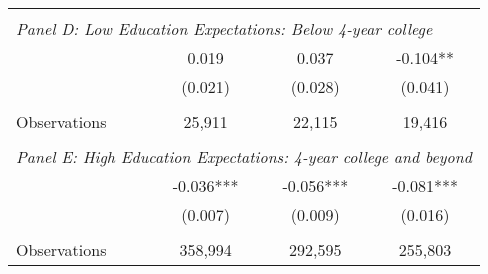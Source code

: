 {\begin{tabular}{lccc}
&  &  &   \\
\multicolumn{4}{l}{\textit{Panel D: Low Education Expectations: Below 4-year college}} \\
\hspace{3mm}        &       0.019   &       0.037   &      -0.104** \\
                    &     (0.021)   &     (0.028)   &     (0.041)   \\
                    &               &               &               \\
\hspace{3mm}Observations&      25,911   &      22,115   &      19,416   \\
 
&  &  &   \\
\multicolumn{4}{l}{\textit{Panel E: High Education Expectations: 4-year college and beyond}} \\
\hspace{3mm}        &      -0.036***&      -0.056***&      -0.081***\\
                    &     (0.007)   &     (0.009)   &     (0.016)   \\
                    &               &               &               \\
\hspace{3mm}Observations&     358,994   &     292,595   &     255,803   \\
 

\bottomrule
\end{tabular}
}
